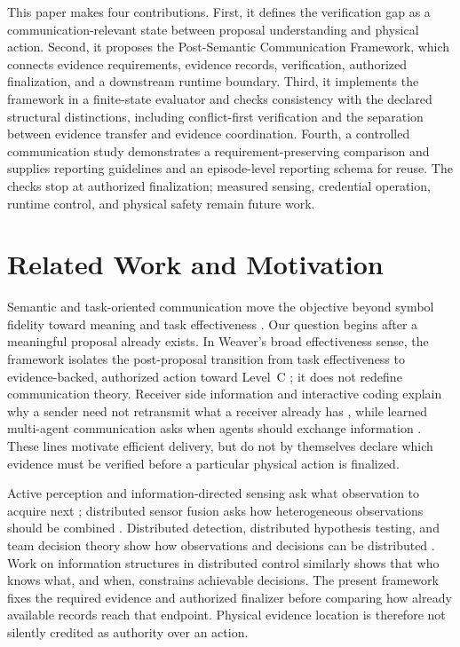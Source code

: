 This paper makes four contributions. First, it defines the verification gap as
a communication-relevant state between proposal understanding and physical
action. Second, it proposes the Post-Semantic Communication Framework, which
connects evidence requirements, evidence records, verification, authorized
finalization, and a downstream runtime boundary. Third, it implements the
framework in a finite-state evaluator and checks consistency with the declared
structural distinctions,
including conflict-first verification and the separation between evidence
transfer and evidence coordination. Fourth, a controlled communication study
demonstrates a requirement-preserving comparison and supplies reporting
guidelines and an episode-level reporting schema for reuse. The checks stop at
authorized finalization; measured sensing, credential operation, runtime
control, and physical safety remain future work.

\section{Related Work and Motivation}

Semantic and task-oriented communication move the objective beyond symbol
fidelity toward meaning and task effectiveness \cite{gunduz,pragcomm}. Our
question begins after a meaningful proposal already exists. In Weaver's broad
effectiveness sense, the framework isolates the post-proposal transition from
task effectiveness to evidence-backed, authorized action toward Level~C
\cite{weaver}; it does not redefine communication
theory. Receiver side information and interactive coding explain why a sender
need not retransmit what a receiver already has \cite{wynerziv,kaspi}, while
learned multi-agent communication asks when agents should exchange information
\cite{when2com}. These lines motivate efficient delivery, but do not by
themselves declare which evidence must be verified before a particular
physical action is finalized.

Active perception and information-directed sensing ask what observation to
acquire next \cite{bajcsy,mackay}; distributed sensor fusion asks how
heterogeneous observations should be combined \cite{hallllinas}. Distributed
detection, distributed hypothesis testing, and team decision theory show how
observations and decisions can be distributed \cite{tenney,ahlswede}. Work on
information structures in distributed control similarly shows that who knows
what, and when, constrains achievable decisions. The present framework fixes
the required evidence and authorized finalizer before comparing how already
available records reach that endpoint. Physical evidence location is therefore
not silently credited as authority over an action.

